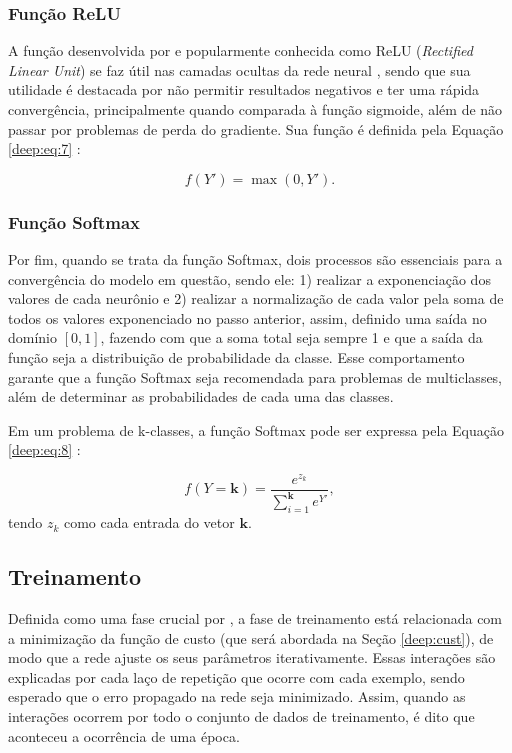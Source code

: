\subsubsection{Função ReLU}
\label{deep:relu}
A função desenvolvida por \cite{Hahnioser2000} e popularmente conhecida como ReLU (\textit{Rectified Linear Unit}) se faz útil nas camadas ocultas da rede neural \citep{Goodfellow2016}, sendo que sua utilidade é destacada por não permitir resultados negativos \citep{Dahl2013} e ter uma rápida convergência, principalmente quando comparada à função sigmoide, além de não passar por problemas de perda do gradiente. Sua função é definida pela Equação \ref{deep:eq:7} \citep{Hahnioser2000}:

\begin{equation}
    \label{deep:eq:7}
    f(Y') = \max(0,Y').
\end{equation}

\subsubsection{Função Softmax}
\label{deep:soft}
Por fim, quando se trata da função Softmax, dois processos são essenciais para a convergência do modelo em questão, sendo ele: 1) realizar a exponenciação dos valores de cada neurônio e 2) realizar a normalização de cada valor pela soma de todos os valores exponenciado no passo anterior, assim, definido uma saída no domínio $[0,1]$, fazendo com que a soma total seja sempre 1 \citep{kotu2018data} e que a saída da função seja a distribuição de probabilidade da classe. Esse comportamento garante que a função Softmax seja recomendada para problemas de multiclasses, além de determinar as probabilidades de cada uma das classes.

Em um problema de k-classes, a função Softmax pode ser expressa pela Equação \ref{deep:eq:8} \citep{kotu2018data}:

\begin{equation}
    \label{deep:eq:8}
    f(Y = \boldsymbol{k}) = \frac{e^{z_k}}{\sum_{i=1}^{\boldsymbol{k}} e^{Y'}},
\end{equation}
tendo $z_k$ como cada entrada do vetor $\boldsymbol{k}$.


\subsection{Treinamento}
\label{deep:train}

Definida como uma fase crucial por \cite{ponti2018funciona}, a fase de treinamento está relacionada com a minimização da função de custo (que será abordada na Seção \ref{deep:cust}), de modo que a rede ajuste os seus parâmetros iterativamente. Essas interações são explicadas por cada laço de repetição que ocorre com cada exemplo, sendo esperado que o erro propagado na rede seja minimizado. Assim, quando as interações ocorrem por todo o conjunto de dados de treinamento, é dito que aconteceu a ocorrência de uma época.

